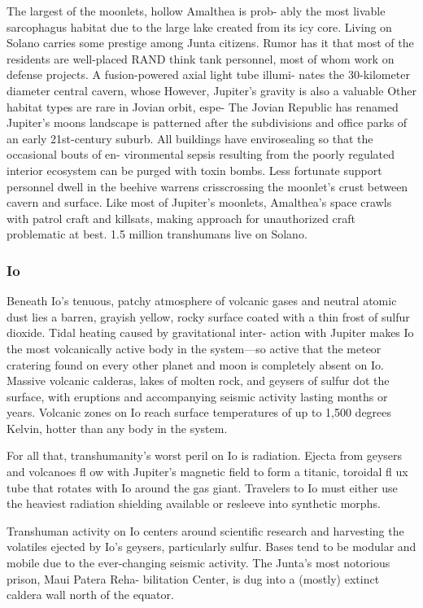 The largest of the moonlets, hollow Amalthea is prob-
ably the most livable sarcophagus habitat due to the 
large lake created from its icy core. Living on Solano 
carries some prestige among Junta citizens. Rumor has 
it that most of the residents are well-placed RAND 
think tank personnel, most of whom work on defense 
projects. A fusion-powered axial light tube illumi-
nates the 30-kilometer diameter central cavern, whose 
However, Jupiter's gravity is also a valuable 
Other habitat types are rare in Jovian orbit, espe-
The Jovian Republic has renamed Jupiter's moons 
landscape is patterned after the subdivisions and office 
parks of an early 21st-century suburb. All buildings 
have envirosealing so that the occasional bouts of en-
vironmental sepsis resulting from the poorly regulated 
interior ecosystem can be purged with toxin bombs. 
Less fortunate support personnel dwell in the beehive 
warrens crisscrossing the moonlet's crust between 
cavern and surface. Like most of Jupiter's moonlets, 
Amalthea's space crawls with patrol craft and killsats, 
making approach for unauthorized craft problematic 
at best. 1.5 million transhumans live on Solano.

\subsubsection{Io}

Beneath Io's tenuous, patchy atmosphere of volcanic 
gases and neutral atomic dust lies a barren, grayish 
yellow, rocky surface coated with a thin frost of sulfur 
dioxide. Tidal heating caused by gravitational inter-
action with Jupiter makes Io the most volcanically 
active body in the system—so active that the meteor 
cratering found on every other planet and moon is 
completely absent on Io. Massive volcanic calderas, 
lakes of molten rock, and geysers of sulfur dot the 
surface, with eruptions and accompanying seismic 
activity lasting months or years. Volcanic zones on 
Io reach surface temperatures of up to 1,500 degrees 
Kelvin, hotter than any body in the system.

For all that, transhumanity's worst peril on Io is 
radiation. Ejecta from geysers and volcanoes fl ow 
with Jupiter's magnetic field to form a titanic, toroidal 
fl ux tube that rotates with Io around the gas giant. 
Travelers to Io must either use the heaviest radiation 
shielding available or resleeve into synthetic morphs.

Transhuman activity on Io centers around scientific 
research and harvesting the volatiles ejected by Io's 
geysers, particularly sulfur. Bases tend to be modular 
and mobile due to the ever-changing seismic activity. 
The Junta's most notorious prison, Maui Patera Reha-
bilitation Center, is dug into a (mostly) extinct caldera 
wall north of the equator.


